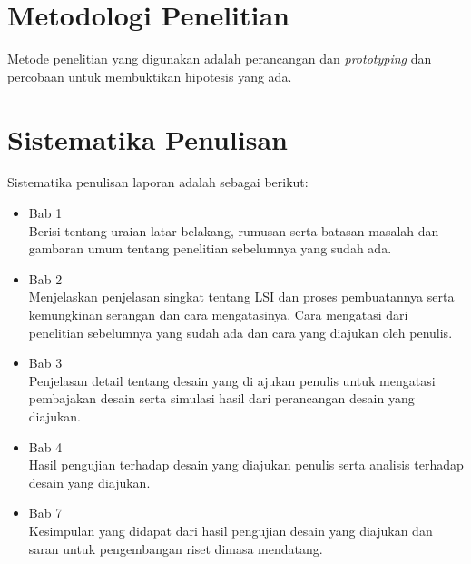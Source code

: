 \section{Metodologi Penelitian}
Metode penelitian yang digunakan adalah perancangan dan \textit{prototyping} dan percobaan untuk membuktikan hipotesis yang ada.

% 

\section{Sistematika Penulisan}
Sistematika penulisan laporan adalah sebagai berikut:

\begin{itemize}
	
	\item Bab 1 \babSatu \\
	Berisi tentang uraian latar belakang, rumusan serta batasan masalah dan gambaran umum tentang penelitian sebelumnya yang sudah ada.
	
	\item Bab 2 \babDua \\
	Menjelaskan penjelasan singkat tentang LSI dan proses pembuatannya serta kemungkinan serangan dan cara mengatasinya. Cara mengatasi dari penelitian sebelumnya yang sudah ada dan cara yang diajukan oleh penulis.
	
	\item Bab 3 \babTiga \\
	Penjelasan detail tentang desain yang di ajukan penulis untuk mengatasi pembajakan desain serta simulasi hasil dari perancangan desain yang diajukan.

	\item Bab 4 \babEmpat \\
	Hasil pengujian terhadap desain yang diajukan penulis serta analisis terhadap desain yang diajukan.
	
	\item Bab 7 \kesimpulan \\
	Kesimpulan yang didapat dari hasil pengujian desain yang diajukan dan saran untuk pengembangan riset dimasa mendatang.
\end{itemize}